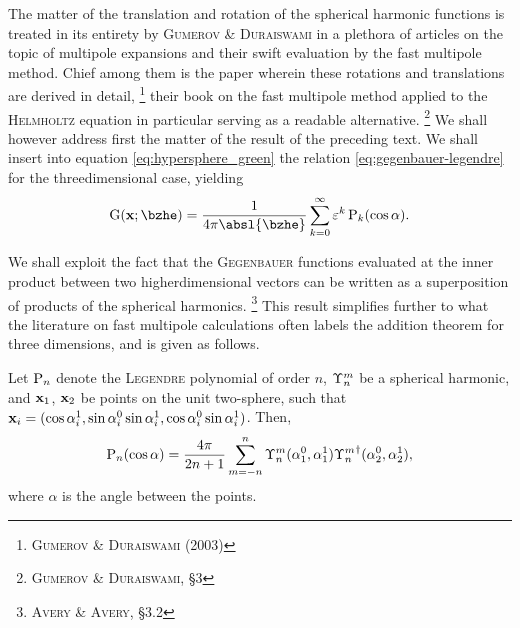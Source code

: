 The matter of the translation and rotation of the spherical harmonic functions is treated in its entirety by \textsc{Gumerov} \& \textsc{Duraiswami} in a plethora of articles on the topic of multipole expansions and their swift evaluation by the fast multipole method.
Chief among them is the paper wherein these rotations and translations are derived in detail,%
\footnote{%
  \cite{gumerov2003recursions} \textsc{Gumerov} \& \textsc{Duraiswami} (2003)
}
their book on the fast multipole method applied to the \textsc{Helmholtz} equation in particular serving as a readable alternative.%
\footnote{%
  \cite{gumerov2004fast} \textsc{Gumerov} \& \textsc{Duraiswami}, \S3
}
We shall however address first the matter of the result of the preceding text.
We shall insert into equation \eqref{eq:hypersphere_green} the relation \eqref{eq:gegenbauer-legendre} for the threedimensional case, yielding
%
\begin{equation}\label{eq:Green_translation}
  \green(\xvec; \bzhe) = \frac{1}{4\pi\absl{\bzhe}} \sum_{k = 0}^{\infty} \varepsilon^k \legendre_k(\cos{\alpha}).
\end{equation}

\noindent
We shall exploit the fact that the \textsc{Gegenbauer} functions evaluated at the inner product between two higherdimensional vectors can be written as a superposition of products of the spherical harmonics.%
\footnote{%
  \cite{avery2018hyperspherical} \textsc{Avery} \& \textsc{Avery}, \S3.2
}
This result simplifies further to what the literature on fast multipole calculations often labels the addition theorem for three dimensions, and is given as follows.

\begin{theorem}
  Let $\operatorname{P}_n$ denote the \textsc{Legendre} polynomial of order $n$, $\Upsilon_{n}^{m}$ be a spherical harmonic, and $\mathbf{x}_1$, $\mathbf{x}_2$ be points on the unit two-sphere, such that $\mathbf{x}_i = (\cos{\alpha_{i}^{1}}, \sin{\alpha_{i}^{0}} \sin{\alpha_{i}^{1}}, \cos{\alpha_{i}^{0}} \sin{\alpha_{i}^{1}})$.
  Then,
  \begin{equation}
    \operatorname{P}_n(\cos{\alpha}) = \frac{4\pi}{2n+1} \sum_{m = -n}^{n} \Upsilon_{n}^{m}(\alpha_{1}^{0}, \alpha_{1}^{1}) {\Upsilon_n^m}^{\dag}(\alpha_{2}^{0}, \alpha_{2}^{1}),
  \end{equation}
  where $\alpha$ is the angle between the points.
\end{theorem}

